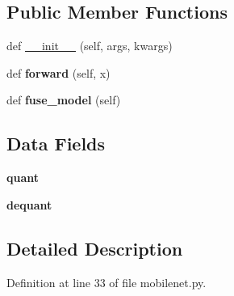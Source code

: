\subsection*{Public Member Functions}
\begin{DoxyCompactItemize}
\item 
def \hyperlink{classtorchvision_1_1models_1_1quantization_1_1mobilenet_1_1QuantizableMobileNetV2_a9a3d16a54240060c280eded19d19eee8}{\+\_\+\+\_\+init\+\_\+\+\_\+} (self, args, kwargs)
\item 
\mbox{\label{classtorchvision_1_1models_1_1quantization_1_1mobilenet_1_1QuantizableMobileNetV2_a70d527ca4ee91c2f413a233a7e525601}} 
def {\bfseries forward} (self, x)
\item 
\mbox{\label{classtorchvision_1_1models_1_1quantization_1_1mobilenet_1_1QuantizableMobileNetV2_a29e268ca9b50d6cf36adac62dc382e17}} 
def {\bfseries fuse\+\_\+model} (self)
\end{DoxyCompactItemize}
\subsection*{Data Fields}
\begin{DoxyCompactItemize}
\item 
\mbox{\label{classtorchvision_1_1models_1_1quantization_1_1mobilenet_1_1QuantizableMobileNetV2_aadb8fa0767cf64d42d17545b5d960220}} 
{\bfseries quant}
\item 
\mbox{\label{classtorchvision_1_1models_1_1quantization_1_1mobilenet_1_1QuantizableMobileNetV2_ae47c8b14ebcddcb6066421b7792427e8}} 
{\bfseries dequant}
\end{DoxyCompactItemize}


\subsection{Detailed Description}


Definition at line 33 of file mobilenet.\+py.




